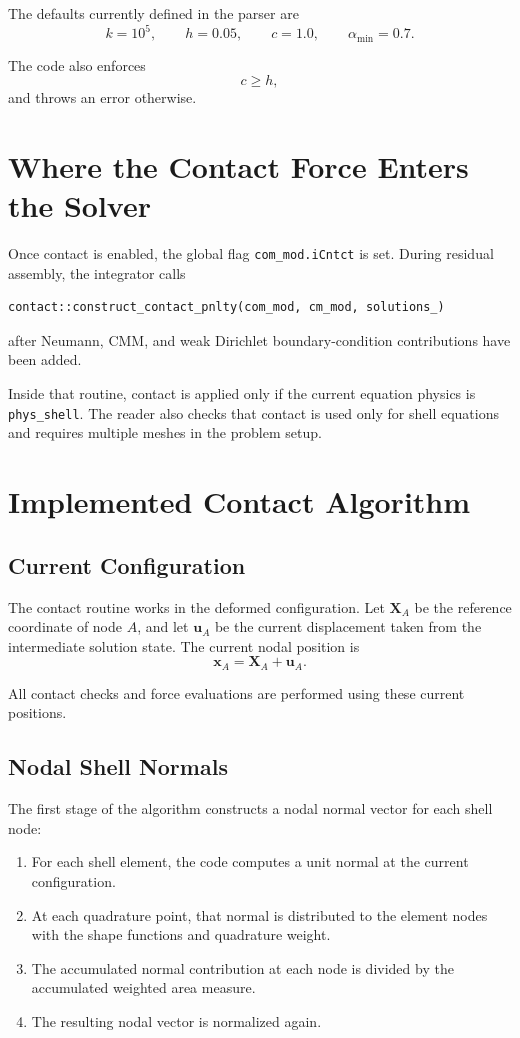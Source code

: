 \documentclass[11pt]{article}
\begin{document}
The defaults currently defined in the parser are
\[
k = 10^5,\qquad h = 0.05,\qquad c = 1.0,\qquad \alpha_{\min} = 0.7.
\]

The code also enforces
\[
c \ge h,
\]
and throws an error otherwise.

\section{Where the Contact Force Enters the Solver}

Once contact is enabled, the global flag \texttt{com\_mod.iCntct} is set. During residual assembly, the integrator calls
\begin{verbatim}
contact::construct_contact_pnlty(com_mod, cm_mod, solutions_)
\end{verbatim}
after Neumann, CMM, and weak Dirichlet boundary-condition contributions have been added.

Inside that routine, contact is applied only if the current equation physics is
\texttt{phys\_shell}. The reader also checks that contact is used only for shell equations and requires multiple meshes in the problem setup.

\section{Implemented Contact Algorithm}

\subsection{Current Configuration}

The contact routine works in the deformed configuration. Let $\bm{X}_A$ be the reference coordinate of node $A$, and let $\bm{u}_A$ be the current displacement taken from the intermediate solution state. The current nodal position is
\[
\bm{x}_A = \bm{X}_A + \bm{u}_A.
\]

All contact checks and force evaluations are performed using these current positions.

\subsection{Nodal Shell Normals}

The first stage of the algorithm constructs a nodal normal vector for each shell node:
\begin{enumerate}[leftmargin=*]
\item For each shell element, the code computes a unit normal at the current configuration.
\item At each quadrature point, that normal is distributed to the element nodes with the shape functions and quadrature weight.
\item The accumulated normal contribution at each node is divided by the accumulated weighted area measure.
\item The resulting nodal vector is normalized again.
\end{enumerate}
\end{document}
